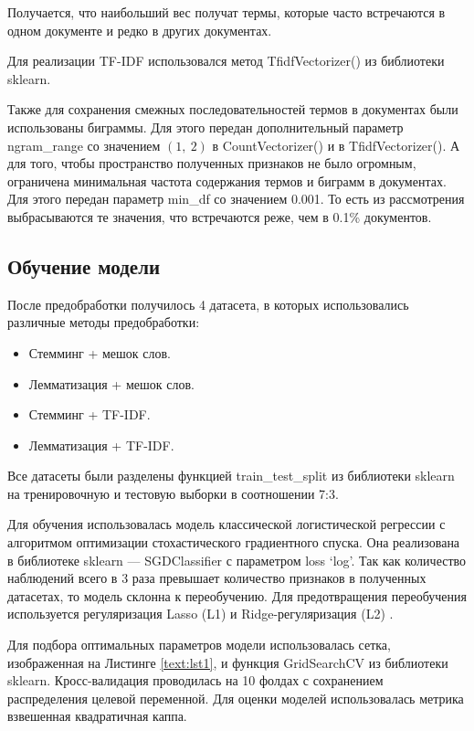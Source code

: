 \documentclass[14pt]{mmcs_article}
\begin{document}
Получается, что наибольший вес получат термы, которые часто встречаются в одном документе и редко в других документах.

Для реализации TF-IDF использовался метод TfidfVectorizer() из библиотеки sklearn. 

Также для сохранения смежных последовательностей термов в документах были использованы биграммы. Для этого передан дополнительный параметр ngram\_range со значением $(1,\ 2)$ в CountVectorizer() и в TfidfVectorizer(). А для того, чтобы пространство полученных признаков не было огромным, ограничена минимальная частота содержания термов и биграмм в документах. Для этого передан параметр min\_df со значением 0.001. То есть из рассмотрения выбрасываются те значения, что встречаются реже, чем в 0.1\% документов.


\subsection{Обучение модели}

После предобработки получилось 4 датасета, в которых использовались различные методы предобработки:
\begin{itemize}
	\item Стемминг + мешок слов.
	\item Лемматизация + мешок слов.
	\item Стемминг + TF-IDF.
	\item Лемматизация + TF-IDF.
\end{itemize}

Все датасеты были разделены функцией train\_test\_split из библиотеки sklearn на тренировочную и тестовую выборки в соотношении 7:3.

Для обучения использовалась модель классической логистической регрессии с алгоритмом оптимизации стохастического градиентного спуска. Она реализована в библиотеке sklearn --- SGDClassifier с параметром loss `log'.  Так как количество наблюдений всего в 3 раза превышает количество признаков в полученных датасетах, то модель склонна к переобучению. Для предотвращения переобучения используется регуляризация Lasso (L1) и Ridge-регуляризация (L2) \cite{lib:regular}.

Для подбора оптимальных параметров модели использовалась сетка, изображенная на Листинге \ref{text:lst1}, и функция GridSearchCV из библиотеки sklearn. Кросс-валидация проводилась на 10 фолдах с сохранением распределения целевой переменной. Для оценки моделей использовалась метрика взвешенная квадратичная каппа.
\end{document}

